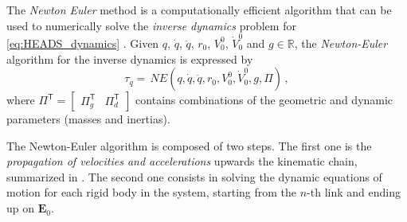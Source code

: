 The \textit{Newton Euler} method is a computationally efficient algorithm that can be used to numerically solve the \textit{inverse dynamics} problem for \eqref{eq:HEADS_dynamics} \cite{Siciliano2009}.
%
%
Given $q$, $\dot{q}$, $\ddot{q}$, $r_{0}$, $V^{0}_{0}$, $\dot{V}^{0}_{0}$ and $g \in \mathbb{R}$, the \textit{Newton-Euler} algorithm for the inverse dynamics is expressed by
%
\begin{equation}
\tau_q = \, NE( q, \dot{q}, \ddot{q}, r_{0}, V^{0}_{0}, \dot{V}^{0}_{0}, g, \Pi ) \,,
\label{eq:NE_algorithm}
\end{equation}
%
where $\Pi^\mathsf{T} = \left[\!\!\begin{array}{cc} \Pi^\mathsf{T}_{g} & \Pi^\mathsf{T}_{d} \end{array}\!\!\right]$ contains combinations of the geometric and dynamic parameters (masses and inertias).


The Newton-Euler algorithm is composed of two steps. The first one is the \textit{propagation of velocities and accelerations} upwards the kinematic chain, summarized in . The second one consists in solving the dynamic equations of motion for each rigid body in the system, starting from the $n$-th link and ending up on $\mathbf{E}_0$. 


